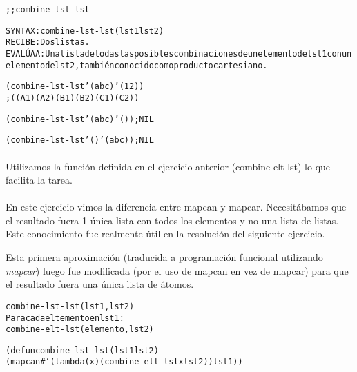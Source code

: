 \begin{aibox}{\function}
\begin{alltt}
;; combine-lst-lst

SYNTAX: combine-lst-lst (lst1 lst2)
RECIBE: Dos listas.
EVALÚA A: Una lista de todas las posibles combinaciones de un elemento de lst1 con un 
elemento de lst2, también conocido como producto cartesiano.
\end{alltt}
\end{aibox}

\begin{aibox}{\examples}
\begin{alltt}
(combine-lst-lst '(a b c) '(1 2))
; ((A 1) (A 2) (B 1) (B 2) (C 1) (C 2))

(combine-lst-lst '(a b c) '()); NIL

(combine-lst-lst '() '(a b c)); NIL
\end{alltt}

\end{aibox}

\begin{aibox}{\comments}

\paragraph{}
Utilizamos la función definida en el ejercicio anterior (combine-elt-lst) lo que facilita la tarea.
\paragraph{}
En este ejercicio vimos la diferencia entre mapcan y mapcar. Necesitábamos que el resultado fuera 1 única lista con todos los elementos y no una lista de listas. Este conocimiento fue realmente útil en la resolución del siguiente ejercicio.
\end{aibox}
\begin{aibox}{\pseudocode}
Esta primera aproximación (traducida a programación funcional utilizando \emph{mapcar}) luego fue modificada (por el uso de mapcan en vez de mapcar) para que el resultado fuera una única lista de átomos.
\begin{alltt}
combine-lst-lst (lst1,lst2)
    Para cada eltemento en lst1:
        combine-elt-lst (elemento,lst2)
\end{alltt}
\end{aibox}
\begin{aibox}{\code}

\begin{alltt}

(defun combine-lst-lst (lst1 lst2)
            (mapcan #'(lambda (x) (combine-elt-lst x lst2)) lst1))

\end{alltt}
\end{aibox}
